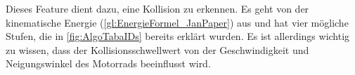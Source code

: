 Dieses Feature dient dazu, eine Kollision zu erkennen. Es geht von der kinematische Energie (\autoref{gl:EnergieFormel_JanPaper}) aus und hat vier mögliche Stufen, die in \autoref{fig:AlgoTabaIDs} bereits erklärt wurden. Es ist allerdings wichtig zu wissen, dass der Kollisionsschwellwert von der Geschwindigkeit und Neigungswinkel des Motorrads beeinflusst wird. 

 


